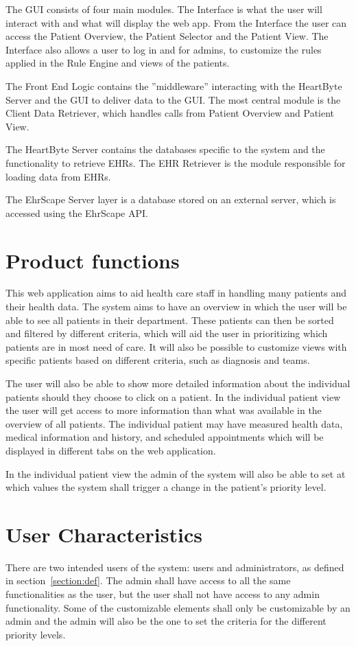 \documentclass{scrreprt}
\begin{document}
The GUI consists of four main modules. The Interface is what the user will interact with and what
will display the web app. From the Interface the user can access the Patient Overview, the Patient Selector and the Patient View. The Interface also allows a user to log in and for admins, to customize the rules applied in the Rule Engine and views of the patients.

The Front End Logic contains the ”middleware” interacting with the HeartByte Server and the GUI
to deliver data to the GUI. The most central module is the Client Data Retriever, which handles calls from Patient Overview and Patient View. 

The HeartByte Server contains the databases specific to the system and the functionality to retrieve
EHRs. The EHR Retriever is the module responsible for loading data from EHRs. 

The EhrScape Server layer is a database stored on an external server, which is accessed using the EhrScape API. 



\section{Product functions} 
This web application aims to aid health care staff in handling many patients and their health data. The system aims to have an overview in which the user will be able to see all patients in their department. These patients can then be sorted and filtered by different criteria, which will aid the user in prioritizing which patients are in most need of care. It will also be possible to customize views with specific patients based on different criteria, such as diagnosis and teams.

The user will also be able to show more detailed information about the individual patients should they choose to click on a patient. In the individual patient view the user will get access to more information than what was available in the overview of all patients. The individual patient may have measured health data, medical information and history, and scheduled appointments which will be displayed in different tabs on the web application. 

In the individual patient view the admin of the system will also be able to set at which values the system shall trigger a change in the patient's priority level. 


\section{User Characteristics}
There are two intended users of the system: users and administrators, as defined in section~\ref{section:def}. The admin shall have access to all the same functionalities as the user, but the user shall not have access to any admin functionality. Some of the customizable elements shall only be customizable by an admin and the admin will also be the one to set the criteria for the different priority levels.
\end{document}

